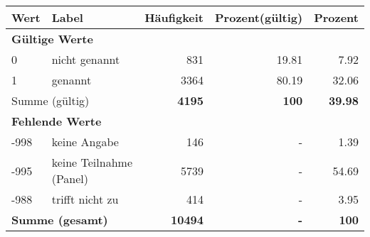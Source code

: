      \begin{longtable}{lXrrr}
     \toprule
     \textbf{Wert} & \textbf{Label} & \textbf{Häufigkeit} & \textbf{Prozent(gültig)} & \textbf{Prozent} \\
     \endhead
     \midrule
     \multicolumn{5}{l}{\textbf{Gültige Werte}}\\

     0 &
     \multicolumn{1}{X}{ nicht genannt   } &


       \num{831} &
       \num[round-mode=places,round-precision=2]{19,81} &
         \num[round-mode=places,round-precision=2]{7,92} \\

     1 &
     \multicolumn{1}{X}{ genannt   } &


       \num{3364} &
       \num[round-mode=places,round-precision=2]{80,19} &
         \num[round-mode=places,round-precision=2]{32,06} \\
     \midrule
     \multicolumn{2}{l}{Summe (gültig)} &
       \textbf{\num{4195}} &
     \textbf{100} &
       \textbf{\num[round-mode=places,round-precision=2]{39,98}} \\
     \multicolumn{5}{l}{\textbf{Fehlende Werte}}\\
       -998 &
       keine Angabe &
         \num{146} &
        - &
         \num[round-mode=places,round-precision=2]{1,39} \\
       -995 &
       keine Teilnahme (Panel) &
         \num{5739} &
        - &
         \num[round-mode=places,round-precision=2]{54,69} \\
       -988 &
       trifft nicht zu &
         \num{414} &
        - &
         \num[round-mode=places,round-precision=2]{3,95} \\
     \midrule
     \multicolumn{2}{l}{\textbf{Summe (gesamt)}} &
          \textbf{\num{10494}} &
        \textbf{-} &
        \textbf{100} \\
     \bottomrule
     \end{longtable}
     
